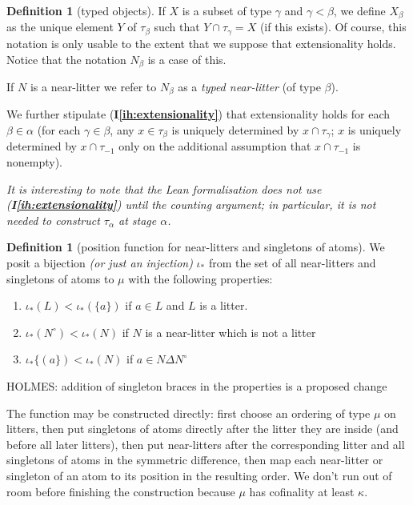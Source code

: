 \documentclass[112pt]{article}
\theoremstyle{definition}
\newtheorem{definition}[theorem]{Definition}
\theoremstyle{remark}
\newcommand{\ihref}[1]{(\textbf{I\ref{#1}})}
\newcommand{\rk}[1]{{\color{blue}\sl #1}}
\newcommand{\suggest}[1]{{\color{red} #1}}
\newcommand{\hsuggest}[1]{{\color{magenta}#1}}
\newenvironment{annot}{\begin{center}\color{blue}\sl}{\end{center}}
\begin{document}
\begin{definition}[typed objects]\label{def:typed_objects}
If $X$ is a subset of type $\gamma$ and $\gamma<\beta$, we define $X_\beta$ as the unique element $Y$ of $\tau_\beta$
such that $Y \cap \tau_\gamma = X$ (if this exists).  Of course, this notation is only usable to the extent that we suppose that extensionality holds.  Notice
that the notation $N_\beta$ is a case of this.

If $N$ is a near-litter we refer to $N_\beta$ as a {\em typed near-litter\/} (of type $\beta$).
\end{definition}

We further stipulate \ihref{ih:extensionality} that extensionality holds for each $\beta\in \alpha$ (for each $\gamma\in \beta$, any $x \in \tau_\beta$ is uniquely determined by $x \cap \tau_\gamma$;  $x$ is uniquely determined by $x \cap \tau_{-1}$ only on the additional assumption that $x \cap \tau_{-1}$ is nonempty).

\begin{annot}
It is interesting to note that the Lean formalisation does not use \ihref{ih:extensionality} until the counting argument; in particular, it is not needed to construct $\tau_\alpha$ at stage $\alpha$.
\end{annot}

\begin{definition}[position function for near-litters and \hsuggest{singletons of} atoms]\label{def:pos_atom_near_litter}
We posit a bijection \rk{(or just an injection)} $\iota_*$ from the set of all near-litters and \hsuggest{singletons of} atoms to $\mu$ with the following properties:

\begin{enumerate}

\item $\iota_*(L) < \iota_*(\{a\})$ if $a \in L$ and $L$ is a litter.

\item  $\iota_*(N^\circ)<\iota_*(N)$ if $N$ is a near-litter which is not a litter

\item $\iota_*\{(a\}) < \iota_*(N)$ if $a \in N \Delta N^\circ$

\end{enumerate}

\hsuggest{HOLMES: addition of singleton braces in the properties is a proposed change}
\end{definition}

The function may be constructed directly: first choose an ordering of type $\mu$ on litters, then put \suggest{singletons of} atoms directly after the litter they are inside (and before all later litters), then put near-litters after the corresponding litter and all \hsuggest{singletons of} atoms in the symmetric difference, then map each near-litter or \hsuggest{singleton of an} atom to its position in the resulting order.
We don't run out of room before finishing the construction because $\mu$ has cofinality at least $\kappa$.
\end{document}
